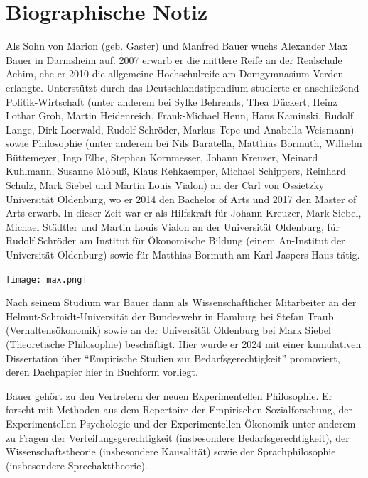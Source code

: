 \documentclass[justified,nobib,nohyper,symmetric,twoside]{tufte-book}
\begin{document}
\cleardoublepage
\chapter*{Biographische Notiz}
Als Sohn von Marion (geb. Gaster) und Manfred Bauer wuchs \mbox{Alexander} Max Bauer in Darmsheim auf.
2007 erwarb er die mittlere Reife an der Realschule Achim, ehe er 2010 die allgemeine Hochschulreife am Domgymnasium Verden erlangte.
Unterstützt durch das Deutschlandstipendium studierte er anschließend Politik-Wirtschaft (unter anderem bei Sylke Behrends, Thea Dückert, Heinz Lothar Grob, Martin Heidenreich, Frank-Michael Henn, Hans Kaminski, Rudolf Lange, Dirk Loerwald, Rudolf Schröder, Markus Tepe und Anabella Weismann) sowie Philosophie (unter anderem bei Nils Baratella, Matthias Bormuth, Wilhelm Büttemeyer, Ingo Elbe, Stephan Kornmesser, Johann Kreuzer, Meinard Kuhlmann, Susanne Möbuß, Klaus Rehkaemper, Michael Schippers, Reinhard Schulz, Mark Siebel und Martin Louis Vialon) an der Carl von Ossietzky Universität Oldenburg, wo er 2014 den Bachelor of Arts und 2017 den Master of Arts erwarb.
In dieser Zeit war er als Hilfskraft für Johann Kreuzer, Mark Siebel, Michael Städtler und Martin Louis \mbox{Vialon} an der Universität Oldenburg, für Rudolf Schröder am Institut für Ökonomische Bildung (einem An-Institut der Universität Oldenburg) sowie für Matthias Bormuth am Karl-Jaspers-Haus tätig.

\begin{marginfigure}[-200pt]
   \texttt{[image: max.png]}
\end{marginfigure}


Nach seinem Studium war Bauer dann als Wissenschaftlicher Mitarbeiter an der Helmut-Schmidt-Universität der Bundeswehr in Hamburg bei Stefan Traub (Verhaltensökonomik) sowie an der Universität Oldenburg bei Mark Siebel (Theoretische Philosophie) beschäftigt.
Hier wurde er 2024 mit einer kumulativen Dissertation über \enquote{Empirische Studien zur Bedarfsgerechtigkeit} promoviert, deren Dachpapier hier in Buchform vorliegt.

Bauer gehört zu den Vertretern der neuen Experimentellen Philosophie.
Er forscht mit Methoden aus dem Repertoire der Empirischen Sozialforschung, der Experimentellen Psychologie und der Experimentellen Ökonomik unter anderem zu Fragen der Verteilungsgerechtigkeit (insbesondere Bedarfsgerechtigkeit), der Wissenschaftstheorie (insbesondere Kausalität) sowie der Sprachphilosophie (insbesondere Sprechakttheorie).
\end{document}

